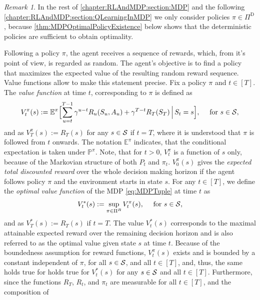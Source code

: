 \documentclass[
    a4paper,
    11pt,
    bibliography=totoc,
    listof=totoc,      
    headinclude=true,
    cleardoublepage=empty,
]{scrbook}
\theoremstyle{plain}
\theoremstyle{definition}
\theoremstyle{remark}
\newtheorem{remark}[theorem]{Remark}
\newcommand{\E}{\mathbb E}
\newcommand{\PM}{\mathbb P}
\newcommand{\SpaceS}{{\cal S}}
\begin{document}
\begin{remark}
    In the rest of \cref{chapter:RLAndMDP:section:MDP} and the following 
    \cref{chapter:RLAndMDP:section:QLearningInMDP} we only consider policies 
    $\pi\in\Pi^\text{D}$, because \cref{thm:MDPOptimalPolicyExistence} below 
    shows that the deterministic policies are sufficient to obtain optimality.
\end{remark}
%
Following a policy $\pi$, the agent receives a sequence of rewards, which, 
from it's point of view, is regarded as random. The agent's objective is to 
find a policy that maximizes the expected value of the resulting random reward 
sequence. Value functions allow to make this statement precise. 
Fix a policy $\pi$ and $t\in[T]$. The \textit{value function} at time $t$, 
corresponding to $\pi$ is defined as
\begin{equation}
\label{eq:MDPValueFunction}
    V^\pi_t(s) 
    := \E^\pi\Bigl[ 
        \sum_{u=t}^{T-1} \gamma^{u-t}R_u(S_u, A_u) + \gamma^{T-t} R_T(S_T)
        \,\Big|\, S_t = s
    \Bigr],
    \quad 
    \text{ for } s\in\SpaceS,
\end{equation}
and as $V^\pi_T(s) := R_T(s)$ for any $s\in\SpaceS$ if $t=T$, where it is 
understood that $\pi$ is followed from $t$ onwards. The notation $\E^\pi$ 
indicates, that the conditional expectation is taken under $\PM^\pi$. Note, 
that for $t>0$, $V_t^\pi$ is a function of $s$ only, because of the Markovian 
structure of both $P_t$ and $\pi_t$. $V_0^\pi(s)$ gives the \textit{expected 
total discounted reward} over the whole decision making horizon if the agent 
follows policy $\pi$ and the environment starts in state $s$. For any 
$t\in[T]$, we define the \textit{optimal value function} of the MDP 
\eqref{eq:MDPTuple} at time $t$ as
\begin{equation}
\label{eq:MDPOptimalValueFunction}
    V^*_t(s) := \sup_{\pi\in\Pi^R} V^\pi_t(s), 
    \quad \text{ for } s\in\SpaceS,
\end{equation}
and as $V^*_T(s):=R_T(s)$ if $t=T$. The value $V^*_t(s)$ corresponds to the 
maximal attainable expected reward over the remaining decision horizon and is 
also referred to as the optimal value given state $s$ at time $t$. Because of 
the boundedness assumption for reward functions, $V_t^\pi(s)$ exists and 
is bounded by a constant independent of $\pi$, for all $s\in\SpaceS$, and all 
$t\in[T]$, and, thus, the same holds true for holds true for $V^*_t(s)$ for 
any $s\in\SpaceS$ and all $t\in[T]$. Furthermore, since the functions $R_T$, 
$R_t$, and $\pi_t$ are measurable for all $t\in[T]$, and the composition of 
\end{document}
